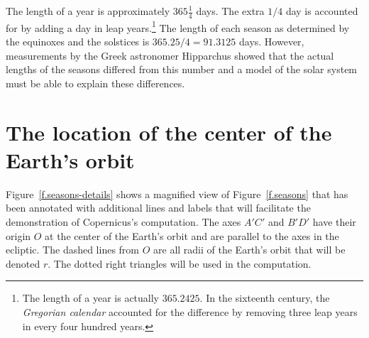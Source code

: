 The length of a year is approximately $365 \frac{1}{4}$ days. The extra $1/4$ day is accounted for by adding a day in leap years.\footnote{The length of a year is actually $365.2425$. In the sixteenth century, the \emph{Gregorian calendar} accounted for the difference by removing three leap years in every four hundred years.} The length of each season as determined by the equinoxes and the solstices is $365.25/4=91.3125$ days. However, measurements by the Greek astronomer Hipparchus showed that the actual lengths of the seasons differed from this number and a model of the solar system must be able to explain these differences.

\section{The location of the center of the Earth's orbit}

Figure~\ref{f.seasons-details} shows a magnified view of Figure~\ref{f.seasons} that has been annotated with additional lines and labels that will facilitate the demonstration of Copernicus's computation. The axes $A'C'$ and $B'D'$ have their origin $O$ at the center of the Earth's orbit and are parallel to the axes in the ecliptic. The dashed lines from $O$ are all radii of the Earth's orbit that will be denoted $r$. The dotted right triangles will be used in the computation.


